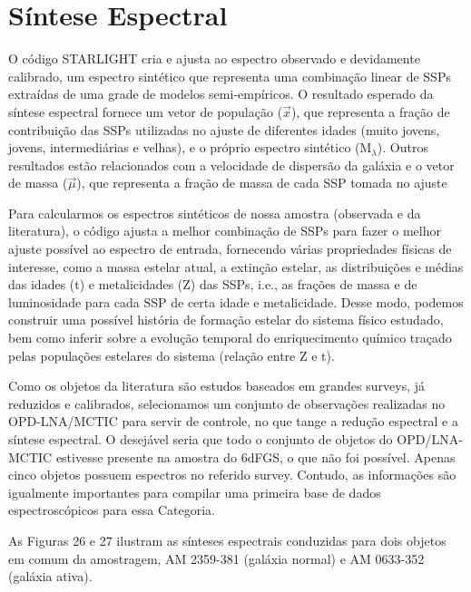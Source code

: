 \section{Síntese Espectral}

O código STARLIGHT cria e ajusta ao espectro observado e devidamente calibrado, um espectro sintético que representa uma combinação linear de SSPs extraídas de uma grade de modelos semi-empíricos. O resultado esperado da síntese espectral fornece um vetor de população ($\vec{x}$), que representa a fração de contribuição das SSPs utilizadas no ajuste de diferentes idades (muito jovens, jovens, intermediárias e velhas), e o próprio espectro sintético (M$_{\lambda}$). Outros resultados estão relacionados com a velocidade de dispersão da galáxia e o vetor de massa ($\vec{\mu}$), que representa a fração de massa de cada SSP tomada no ajuste

Para calcularmos os espectros sintéticos de nossa amostra (observada e da literatura), o código ajusta a melhor combinação de SSPs para fazer o melhor ajuste possível ao espectro de entrada, fornecendo várias propriedades 
físicas de interesse, como a massa estelar atual, a extinção estelar, as distribuições e médias das idades (t) e metalicidades (Z) das SSPs, i.e., as frações de massa e de luminosidade para cada SSP de certa idade e metalicidade. Desse modo, podemos construir uma possível história de formação estelar do sistema físico estudado, bem como inferir sobre a evolução temporal do enriquecimento químico traçado pelas populações estelares do sistema (relação entre Z e t).

Como os objetos da literatura são estudos baseados em grandes surveys, já reduzidos e calibrados, selecionamos um conjunto de observações realizadas no OPD-LNA/MCTIC para servir de controle, no que tange a redução espectral e a síntese espectral. O desejável seria que todo o conjunto de objetos do OPD/LNA-MCTIC estivesse presente na amostra do 6dFGS, o que não foi possível. Apenas cinco objetos possuem espectros no referido survey. Contudo, as informações são igualmente importantes para compilar uma primeira base de dados espectroscópicos para essa Categoria.

As Figuras 26 e 27 ilustram as sínteses espectrais conduzidas para dois objetos em comum da amostragem, AM 2359-381 (galáxia normal) e AM 0633-352 (galáxia ativa).

